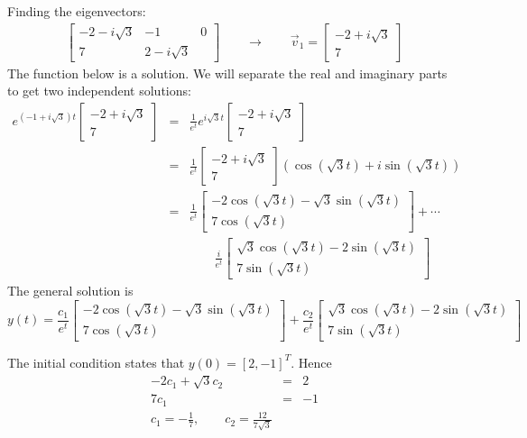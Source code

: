 Finding the eigenvectors:
\begin{eqnarray*}
\left[\begin{array}{cc|c}-2-i\sqrt{3}&-1&0\\7&2-i\sqrt{3}\end{array}\right]\qquad\rightarrow\qquad
\vec{v}_1=\left[\begin{array}{c}-2+i\sqrt{3}\\7\end{array}\right]
\end{eqnarray*}
The function below is a solution. We will separate the real and imaginary parts to get two independent solutions:
\begin{eqnarray*}
e^{(-1+i\sqrt{3})t}\left[\begin{array}{c}-2+i\sqrt{3}\\7\end{array}\right]&=&
\frac{1}{e^t}e^{i\sqrt{3}t}\left[\begin{array}{c}-2+i\sqrt{3}\\7\end{array}\right]\\
&=&\frac{1}{e^t}\left[\begin{array}{c}-2+i\sqrt{3}\\7\end{array}\right](\cos(\sqrt{3}t)+i\sin(\sqrt{3}t))\\
&=&\frac{1}{e^t}\left[\begin{array}{c}-2\cos(\sqrt{3}t)-\sqrt{3}\sin(\sqrt{3}t)\\7\cos(\sqrt{3}t)\end{array}\right]+\cdots\\ &&\qquad \frac{i}{e^t}\left[\begin{array}{c}\sqrt{3}\cos(\sqrt{3}t)-2\sin(\sqrt{3}t)\\7\sin(\sqrt{3}t)\end{array}\right]
\end{eqnarray*}
The general solution is
$$
y(t)=\frac{c_1}{e^t}\left[\begin{array}{c}-2\cos(\sqrt{3}t)-\sqrt{3}\sin(\sqrt{3}t)\\7\cos(\sqrt{3}t)\end{array}\right]+\frac{c_2}{e^t}\left[\begin{array}{c}\sqrt{3}\cos(\sqrt{3}t)-2\sin(\sqrt{3}t)\\7\sin(\sqrt{3}t)\end{array}\right]
$$

The initial condition states that $y(0)=[2,-1]^T$. Hence
\begin{eqnarray*}
  -2c_1+\sqrt{3}c_2&=&2\\7c_1 & =&-1\\
	c_1=-\frac{1}{7},\qquad c_2=\frac{12}{7\sqrt{3}}
\end{eqnarray*}

